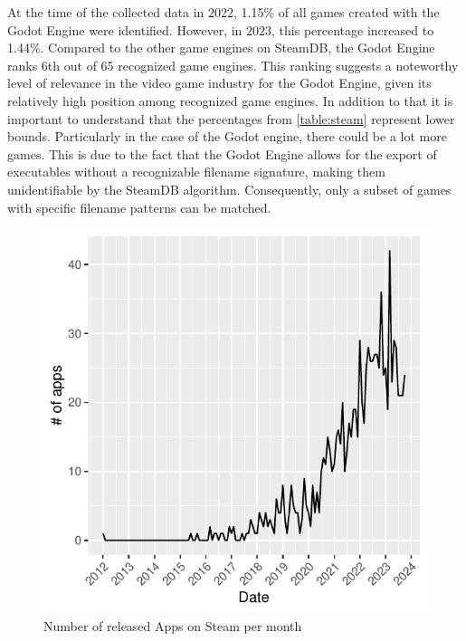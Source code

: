 At the time of the collected data in 2022, 1.15\% of all games created with the Godot Engine were identified.
However, in 2023, this percentage increased to 1.44\%.
Compared to the other game engines on SteamDB, the Godot Engine ranks 6th out of 65 recognized game engines.
This ranking suggests a noteworthy level of relevance in the video game industry for the Godot Engine, given its relatively high position among recognized game engines.
In addition to that it is important to understand that the percentages from \autoref{table:steam} represent lower bounds.
Particularly in the case of the Godot engine, there could be a lot more games.
This is due to the fact that the Godot Engine allows for the export of executables without a recognizable filename signature, making them unidentifiable by the SteamDB algorithm.
Consequently, only a subset of games with specific filename patterns can be matched. \\

\begin{figure}[h!]
    \begin{center}
        \includegraphics[width=1\columnwidth]{figures/godot-graph.pdf}
        \caption{\label{fig:godot-graph} Number of released Apps on Steam per month}
    \end{center}
\end{figure}

